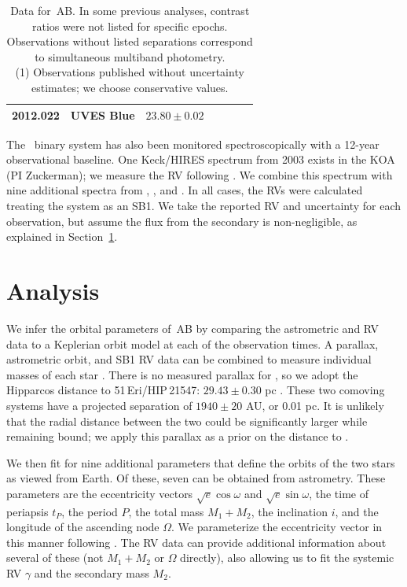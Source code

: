 \begin{landscape}
\begin{table}[hbt!]
\begin{center}
\begin{tabular}{lcccccc}
2012.022 & UVES Blue &        $23.80 \pm 0.02$   &        &       &         &  \citet{Elliott14} \\
\hline
\end{tabular}
\caption[Data for \thisstarsix\,AB]{Data for \thisstarsix\,AB. In some previous analyses, contrast ratios were not listed for specific epochs.
Observations without listed separations correspond to simultaneous multiband photometry. \\
(1) Observations published without uncertainty estimates; we choose conservative
values.}
\end{center}
\label{tab:astrometry}
\end{table}
\end{landscape}
\clearpage



The \thisstarsix\ binary system has also been monitored spectroscopically with a 12-year observational baseline.
One Keck/HIRES spectrum from 2003 exists in the KOA (PI Zuckerman); we measure
the RV following \citet{Kraus15}.
We combine this spectrum with nine additional spectra from \citet{Bailey12}, \citet{Shkolnik12},
and \citet{Elliott14}.
In all cases, the RVs were calculated treating the system as an SB1.
We take the reported RV and uncertainty for each observation, but assume the flux from the secondary
is non-negligible, as explained in Section~\ref{sec:analysis}.

\section{Analysis}
\label{sec:analysis}



We infer the orbital parameters of \thisstarsix\,AB by comparing the astrometric
and RV data to a Keplerian orbit model at each of the observation
times.
A parallax, astrometric orbit, and SB1 RV data can be combined to measure individual
masses of each star \citep[e.g.][]{Bean07}.
There is no measured parallax for \thisstarsix, so we adopt the Hipparcos distance to 51\,Eri/HIP\,21547: 
$29.43 \pm 0.30$ pc \citep{vanLeeuwen07}.
These two comoving systems have a projected separation of $1940 \pm 20$ AU,
or 0.01 pc. It is unlikely that the radial distance between the two could
be significantly larger while remaining bound; we apply this parallax
as a prior on the distance to \thisstarsix.

We then fit for nine additional parameters that define the orbits of
the two stars as viewed from Earth.
Of these, seven can be obtained from astrometry.
These parameters are the eccentricity vectors $\sqrt{e} \cos{\omega}$ and
$\sqrt{e} \sin{\omega}$, the time of periapsis $t_P$, the period $P$, 
the total mass $M_1 + M_2$, the inclination $i$, and the 
longitude of the ascending node $\Omega$.
We parameterize the eccentricity vector in this manner following \citet{Eastman13}.
The RV data can provide additional information about several of these
(not $M_1 + M_2$ or $\Omega$ directly), also allowing us to fit the
systemic RV $\gamma$ and the secondary mass $M_2$.


